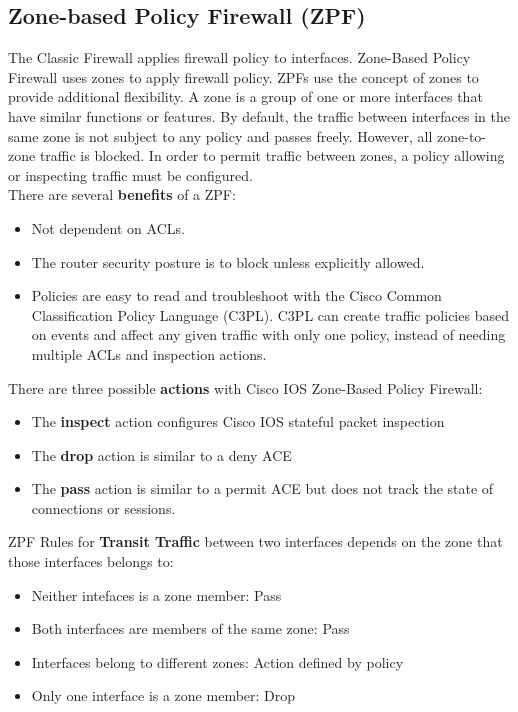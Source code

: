 \subsection{Zone-based Policy Firewall (ZPF)}\label{sec:ZPF}

The Classic Firewall applies firewall policy to interfaces. Zone-Based Policy Firewall uses zones to apply firewall policy. ZPFs use the concept of zones to provide additional flexibility. A zone is a group of one or more interfaces that have similar functions or features. By default, the traffic between interfaces in the same zone is not subject to any policy and passes freely. However, all zone-to-zone traffic is blocked. In order to permit traffic between zones, a policy allowing or inspecting traffic must be configured.\\

There are several \textbf{benefits} of a ZPF:

\begin{itemize}
\item Not dependent on ACLs.
\item The router security posture is to block unless explicitly allowed.
\item Policies are easy to read and troubleshoot with the Cisco Common Classification Policy Language (C3PL). C3PL can create traffic policies based on events and affect any given traffic with only one policy, instead of needing multiple ACLs and inspection actions.
\end{itemize}

There are three possible \textbf{actions} with Cisco IOS Zone-Based Policy Firewall:

\begin{itemize}
\item The \textbf{inspect} action configures Cisco IOS stateful packet inspection
\item The \textbf{drop} action is similar to a deny ACE
\item The \textbf{pass} action is similar to a permit ACE but does not track the state of connections or sessions.
\end{itemize}

ZPF Rules for \textbf{Transit Traffic} between two interfaces depends on the zone that those interfaces belongs to:

\begin{itemize}
\item Neither intefaces is a zone member: Pass
\item Both interfaces are members of the same zone: Pass
\item Interfaces belong to different zones: Action defined by policy
\item Only one interface is a zone member: Drop
\end{itemize}

